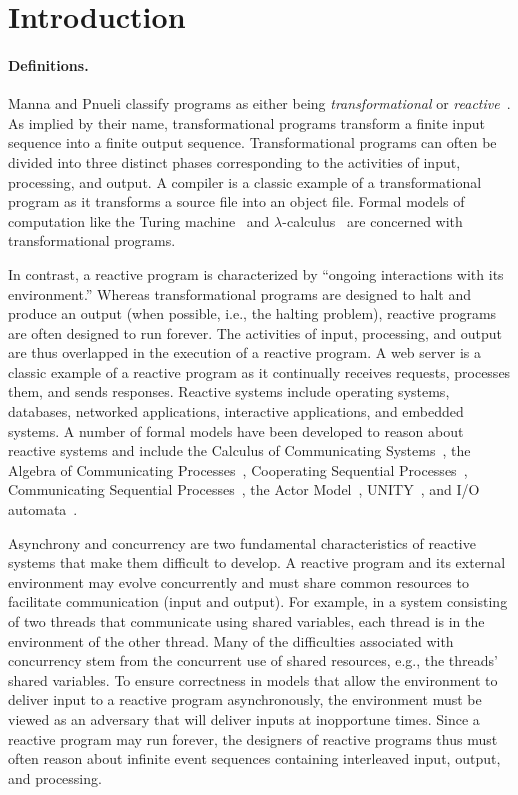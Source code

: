 \section{Introduction \label{introduction}}

\paragraph{Definitions.}
Manna and Pnueli classify programs as either being \emph{transformational} or \emph{reactive}~\cite{manna1992temporal}.
As implied by their name, transformational programs transform a finite input sequence into a finite output sequence.
Transformational programs can often be divided into three distinct phases corresponding to the activities of input, processing, and output.
A compiler is a classic example of a transformational program as it transforms a source file into an object file.
Formal models of computation like the Turing machine~\cite{turing1936computable} and $\lambda$-calculus~\cite{church1936unsolvable} are concerned with transformational programs.

In contrast, a reactive program is characterized by ``ongoing interactions with its environment\cite{manna1992temporal}.''
Whereas transformational programs are designed to halt and produce an output (when possible, i.e., the halting problem), reactive programs are often designed to run forever.
The activities of input, processing, and output are thus overlapped in the execution of a reactive program.
A web server is a classic example of a reactive program as it continually receives requests, processes them, and sends responses.
Reactive systems include operating systems, databases, networked applications, interactive applications, and embedded systems.
A number of formal models have been developed to reason about reactive systems and include the Calculus of Communicating Systems~\cite{milner1982calculus}, the Algebra of Communicating Processes~\cite{bergstra1982fixed}, Cooperating Sequential Processes~\cite{dijkstra1965cooperating}, Communicating Sequential Processes~\cite{hoare1978communicating}, the Actor Model~\cite{hewitt1973universal}\cite{clinger1981foundations}\cite{agha1985actors}, UNITY~\cite{chandy1989parallel}, and I/O automata~\cite{nancy1996distributed}.

Asynchrony and concurrency are two fundamental characteristics of reactive systems that make them difficult to develop.
A reactive program and its external environment may evolve concurrently and must share common resources to facilitate communication (input and output).
For example, in a system consisting of two threads that communicate using shared variables, each thread is in the environment of the other thread.
Many of the difficulties associated with concurrency stem from the concurrent use of shared resources, e.g., the threads' shared variables.
To ensure correctness in models that allow the environment to deliver input to a reactive program asynchronously, the environment must be viewed as an adversary that will deliver inputs at inopportune times.
Since a reactive program may run forever, the designers of reactive programs thus must often reason about infinite event sequences containing interleaved input, output, and processing.

